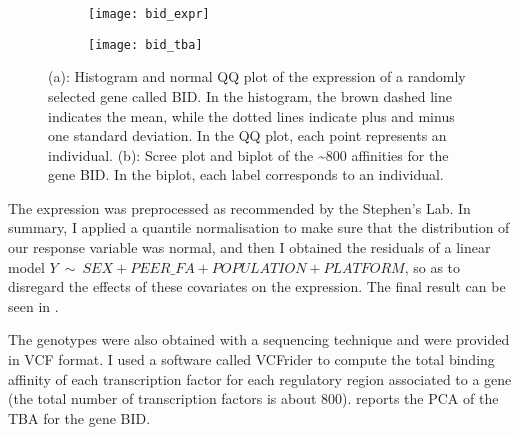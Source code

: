 \begin{figure}[H]
  \begin{subfigure}{\textwidth}
	\centering
	\caption{}
	\texttt{[image: bid\_expr]}
  \end{subfigure}

  \begin{subfigure}{\textwidth}
    \centering
    \caption{}
    \texttt{[image: bid\_tba]}
  \end{subfigure}
  \caption{(a): Histogram and normal QQ plot of the 
expression of a randomly selected gene called BID. In the histogram, the 
brown dashed line indicates the mean, while the dotted lines indicate 
plus and minus one standard deviation. In the QQ 
plot, each point represents an individual. (b): Scree plot and biplot of 
the \textasciitilde800 affinities for the gene BID. In the biplot, each 
label corresponds to an individual.}
\end{figure}

The expression was preprocessed as recommended by the Stephen's 
Lab. 
In summary, I applied a quantile normalisation to make sure that the 
distribution of our response variable was normal, and then I obtained 
the residuals of a linear model 
$Y~\sim~SEX+PEER\_FA+POPULATION+PLATFORM$, so as to disregard the 
effects of these covariates on the expression. The final result can be 
seen in .

The genotypes were also obtained with a sequencing technique and were 
provided in VCF format.  I 
used a software called 
\nohyphens{VCF\textunderscore\nobreak\hspace{0pt}rider} 
to compute the total binding affinity of each transcription factor for 
each regulatory region associated to a gene (the total number of 
transcription factors is about 800).  reports the PCA of 
the TBA for the gene BID.
